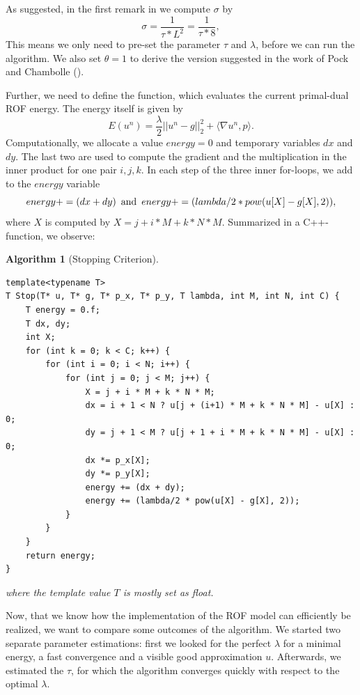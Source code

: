 \documentclass{scrreprt}
\newtheorem{algorithm}[theorem]{Algorithm}
\begin{document}
                As suggested, in the first remark in \cite{Chambolle10afirst-order} we compute $\sigma$ by
                    $$
                        \sigma = \frac{1}{\tau * L^{2}} = \frac{1}{\tau * 8},
                    $$
                This means we only need to pre-set the parameter $\tau$ and $\lambda$, before we can run the algorithm. We also set $\theta = 1$ to derive the version suggested in the work of Pock and Chambolle (\cite{Chambolle10afirst-order}).

                Further, we need to define the function, which evaluates the current primal-dual ROF energy. The energy itself is given by
                    $$
                        E(u^{n}) = \frac{\lambda}{2} ||u^{n} - g||_{2}^{2} + \langle \nabla u^{n}, p \rangle.
                    $$
                Computationally, we allocate a value $energy = 0$ and temporary variables $dx$ and $dy$. The last two are used to compute the gradient and the multiplication in the inner product for one pair $i,j,k$. In each step of the three inner for-loops, we add to the $energy$ variable
                    $$
                        energy += (dx + dy) \,\,\, \textnormal{and} \,\,\, energy += (lambda/2 * pow(u[X] - g[X], 2)),
                    $$
                where $X$ is computed by $X = j + i * M + k * N * M$. Summarized in a C++-function, we observe:

                    \begin{algorithm}[Stopping Criterion]
                    \label{alg:stop_rof_tvl1}
                        \begin{lstlisting}
template<typename T>
T Stop(T* u, T* g, T* p_x, T* p_y, T lambda, int M, int N, int C) {
    T energy = 0.f;
    T dx, dy;
    int X;
    for (int k = 0; k < C; k++) {
        for (int i = 0; i < N; i++) {
            for (int j = 0; j < M; j++) {
                X = j + i * M + k * N * M;
                dx = i + 1 < N ? u[j + (i+1) * M + k * N * M] - u[X] : 0;
                dy = j + 1 < M ? u[j + 1 + i * M + k * N * M] - u[X] : 0;
                dx *= p_x[X];
                dy *= p_y[X];
                energy += (dx + dy);
                energy += (lambda/2 * pow(u[X] - g[X], 2));
            }
        }
    }
    return energy;
}
                        \end{lstlisting}
                        where the template value $T$ is mostly set as float.
                    \end{algorithm}

                Now, that we know how the implementation of the ROF model can efficiently be realized, we want to compare some outcomes of the algorithm. We started two separate parameter estimations: first we looked for the perfect $\lambda$ for a minimal energy, a fast convergence and a visible good approximation $u$. Afterwards, we estimated the $\tau$, for which the algorithm converges quickly with respect to the optimal $\lambda$.
\end{document}
